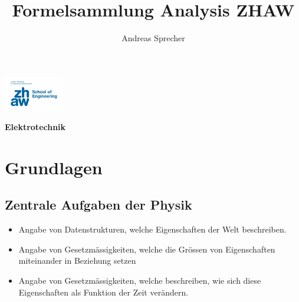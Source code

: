 \documentclass[8pt,a4paper]{scrartcl}
\title{Formelsammlung Analysis ZHAW}
\author{Andreas Sprecher}
\renewcommand{\emph}[1]{\textbf{#1}}                                                            %
\begin{document}
\begin{multicols*}{3}
\setlength{\columnseprule}{0.4pt}
    \parbox{3cm}{
        \includegraphics[height=1.5cm]{./img/Logo.jpeg}
    }
    \parbox{4cm}{
        \emph{\Large{Elektrotechnik}}
    }
    \vspace{-2mm} 

    \section{Grundlagen}
		\subsection{Zentrale Aufgaben der Physik}    
    			\begin{itemize}\itemsep0pt				
				\item Angabe von Datenstrukturen, welche Eigenschaften der Welt beschreiben.
				\item Angabe von Gesetzmässigkeiten, welche die Grössen von Eigenschaften miteinander in Beziehung setzen
				\item Angabe von Gesetzmässigkeiten, welche beschreiben, wie sich diese Eigenschaften als Funktion der Zeit verändern.
			\end{itemize}
    

\end{multicols*}
\end{document}
